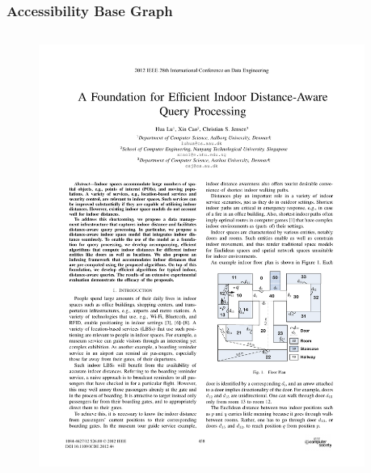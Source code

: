 
\begin{frame}
\frametitle{Accessibility Base Graph}

\begin{columns}[c]

  \vspace{-15pt}
  \begin{figure}[tb]
    \includegraphics[width=0.85\columnwidth]{figures/2-5/2-5-1.pdf}
  \end{figure}
  \begin{example}
    \textrm{
    }
  \end{example}


\end{columns}
\end{frame}
